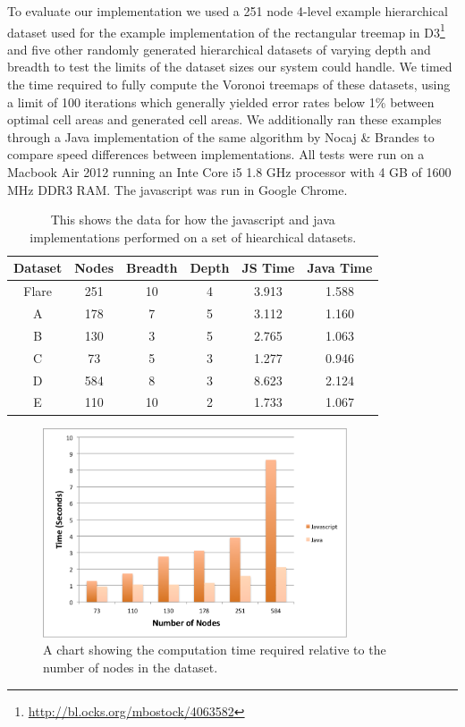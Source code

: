 \documentclass{acm_proc_article-sp} \usepackage{cite}
\begin{document}
To evaluate our implementation we used a 251 node 4-level example
hierarchical dataset used for the example implementation of the
rectangular treemap in D3\footnote{\url{http://bl.ocks.org/mbostock/4063582} }
and five other randomly generated
hierarchical datasets of varying depth and breadth to test the limits
of the dataset sizes our system could handle. We timed the time
required to fully compute the Voronoi treemaps of these datasets,
using a limit of 100 iterations which generally yielded error rates
below 1\% between optimal cell areas and generated cell areas. We
additionally ran these examples through a Java implementation of the
same algorithm by Nocaj \& Brandes to compare speed differences
between implementations. All tests were run on a Macbook Air 2012
running an Inte Core i5 1.8 GHz processor with 4 GB of 1600 MHz DDR3
RAM. The javascript was run in Google Chrome.

\begin{table}
\begin{tabular}{ | c | c | c | c | c | c |}
\hline Dataset & Nodes & Breadth & Depth & JS Time & Java Time
\\ \hline Flare & 251 & 10 & 4 & 3.913 & 1.588 \\ A & 178 & 7 & 5 &
3.112 & 1.160 \\ B & 130 & 3 & 5 & 2.765 & 1.063 \\ C & 73 & 5 & 3 &
1.277 & 0.946 \\ D & 584 & 8 & 3 & 8.623 & 2.124 \\ E & 110 & 10 & 2 &
1.733 & 1.067 \\ \hline
\end{tabular}
\caption{This shows the data for how the javascript and java
  implementations performed on a set of hiearchical datasets.}
\label{fig:table}
\end{table}


\begin{figure}
\centering \includegraphics[width=90mm]{figures/chart.png}
\caption{\label{fig:chart} A chart showing the computation time
  required relative to the number of nodes in the dataset.  }
\end{figure}
\end{document}
